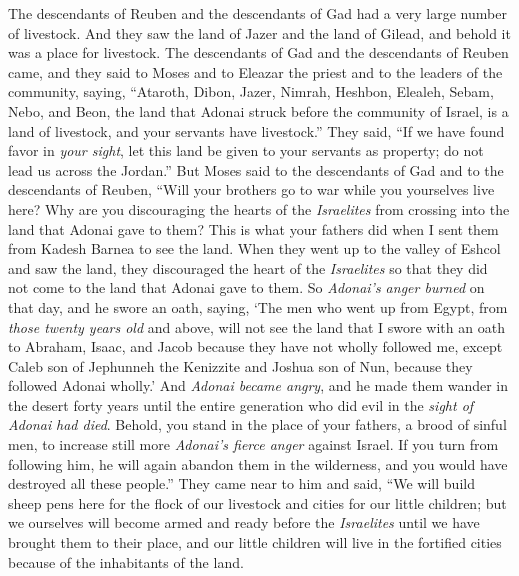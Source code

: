 \begin{biblechapter} %
 The descendants of Reuben and the descendants of Gad had a very large number of livestock. And they saw the land of Jazer and the land of Gilead, and behold it was a place for livestock.
\verse The descendants of Gad and the descendants of Reuben came, and they said to Moses and to Eleazar the priest and to the leaders of the community, saying,
\verse “Ataroth, Dibon, Jazer, Nimrah, Heshbon, Elealeh, Sebam, Nebo, and Beon,
\verse the land that Adonai struck before the community of Israel, is a land of livestock, and your servants have livestock.”
\verse They said, “If we have found favor in \textit{your sight}, let this land be given to your servants as property; do not lead us across the Jordan.”
\verse But Moses said to the descendants of Gad and to the descendants of Reuben, “Will your brothers go to war while you yourselves live here?
\verse Why are you discouraging the hearts of the \textit{Israelites} from crossing into the land that Adonai gave to them?
\verse This is what your fathers did when I sent them from Kadesh Barnea to see the land.
\verse When they went up to the valley of Eshcol and saw the land, they discouraged the heart of the \textit{Israelites} so that they did not come to the land that Adonai gave to them.
\verse So \textit{Adonai’s anger burned} on that day, and he swore an oath, saying,
\verse ‘The men who went up from Egypt, from \textit{those twenty years old} and above, will not see the land that I swore with an oath to Abraham, Isaac, and Jacob because they have not wholly followed me,
\verse except Caleb son of Jephunneh the Kenizzite and Joshua son of Nun, because they followed Adonai wholly.’
\verse And \textit{Adonai became angry}, and he made them wander in the desert forty years until the entire generation who did evil in the \textit{sight of Adonai} \textit{had died}.
\verse Behold, you stand in the place of your fathers, a brood of sinful men, to increase still more \textit{Adonai’s fierce anger} against Israel.
\verse If you turn from following him, he will again abandon them in the wilderness, and you would have destroyed all these people.”
\verse They came near to him and said, “We will build sheep pens here for the flock of our livestock and cities for our little children;
\verse but we ourselves will become armed and ready before the \textit{Israelites} until we have brought them to their place, and our little children will live in the fortified cities because of the inhabitants of the land.

\end{biblechapter}
